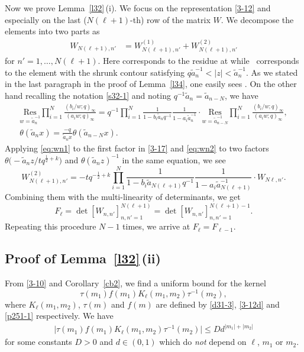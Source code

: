 \documentclass[11pt]{article}
\numberwithin{equation}{section}
\numberwithin{equation}{section}
\def\i{\infty}
\def\t{\tau}
\begin{document}
 Now we prove Lemma~\ref{l32}\,(i). We focus on the representation \eqref{3-12} and especially on the last ($N(\ell+1)$-th) row of the matrix $W$. We decompose the elements into two parts as
\begin{align*}%
 W_{N(\ell+1),n'}
 &=W^{(1)}_{N(\ell+1),n'}+W^{(2)}_{N(\ell +1),n'}
\end{align*}
 for $n'\!=\!1,\dots,N(\ell+1)$. Here
  corresponds to
 the residue at 
 while~ corresponds to the element with the shrunk contour
 satisfying
 $q\tilde{a}_{n}^{-1}<|z|<\tilde{a}_{n}^{-1}$.
 As we stated in the last paragraph in the proof of Lemma~\ref{l34}, one easily sees .
 On the other hand recalling the notation \eqref{s32-1} and noting $q^{-1}\tilde{a}_n=\tilde{a}_{n-N}$, we have
 \begin{gather}
\underset{w=\tilde{a}_{n}^{-1}}{\text{Res}}
 \prod_{i=1}^N\frac{(b_i/w;q)_{\i}}{(a_i w;q)_{\i}}
 = q^{-1}
 \prod_{i=1}^N\frac{1}{1-b_i\tilde{a}_nq^{-1}}\frac{1}{1-a_i\tilde{a}_n^{-1}}
 \cdot
 \underset{w=\tilde{a}_{n-N}^{-1}}{\text{Res}}
 \prod_{i=1}^N\frac{(b_i/w;q)_{\i}}{(a_i w;q)_{\i}}, \label{eq:wn1}
 \\
 \theta(\tilde{a}_n x)=\frac{-q}{\tilde{a}_n x}
 \theta(\tilde{a}_{n-N}x).\label{eq:wn2}
 \end{gather}
 Applying \eqref{eq:wn1} to the first factor in \eqref{3-17} and \eqref{eq:wn2} to two factors $\theta\bigl(-\tilde{a}_n z/tq^{\frac12+k}\bigr)$ and $\theta(\tilde{a}_nz)^{-1}$ in the same equation, we see
 \[%
 W^{(2)}_{N(\ell+1),n'}=-tq^{-\frac12+k}\prod_{i=1}^N\frac{1}{1-b_i\tilde{a}_{N(\ell+1)}q^{-1}}\frac{1}{1-a_i\tilde{a}_{N(\ell+1)}^{-1}}\cdot W_{N\ell,n'}.
 \]
 Combining them
 with the multi-linearity of determinants,
 we get
\[
 F_{\ell}=\det[W_{n,n'}]_{n,n'=1}^{N(\ell +1)}
 =
 \det[W_{n,n'}]_{n,n'=1}^{N(\ell+1)-1}.
\]
 Repeating this procedure $N-1$ times, we arrive at $F_{\ell}=F_{\ell-1}$.


\subsection[Proof of Lemma 3.4 (ii)]{Proof of Lemma~\ref{l32}\,(ii)}
\label{s33}
 From \eqref{3-10}
 and Corollary~\ref{cb2}, we find a uniform bound for the kernel
 \[
 \t(m_1)f(m_1)K_{\ell}(m_1,m_2)\t^{-1}(m_2),
 \]
 where
 $K_{\ell}(m_1,m_2)$, $\t(m)$ and $f(m)$ are defined by \eqref{d31-3}, \eqref{3-12d} and \eqref{p251-1} respectively. We have
 \begin{align}
 \label{3-32}
 \big|\t(m_1)f(m_1)K_{\ell}(m_1,m_2)\t^{-1}(m_2) \big|\le Dd^{|m_1|+|m_2|}
 \end{align}
 for some constants $D>0$ and $d\in (0,1)$ which do {\it not} depend on $\ell$, $m_1$ or $m_2$.
\end{document}
